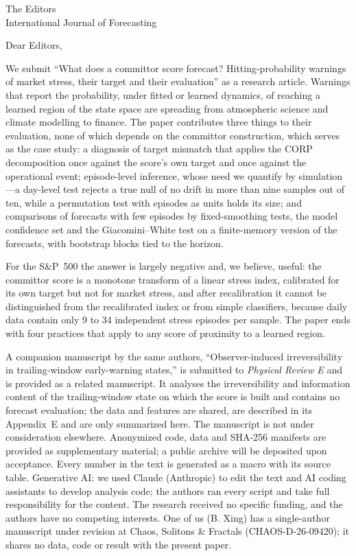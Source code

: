 \documentclass[11pt]{letter}
\begin{document}
\begin{letter}{The Editors\\International Journal of Forecasting}
\opening{Dear Editors,}
We submit ``What does a committor score forecast? Hitting-probability warnings of market stress, their target and their evaluation'' as a research article. Warnings that report the probability, under fitted or learned dynamics, of reaching a learned region of the state space are spreading from atmospheric science and climate modelling to finance. The paper contributes three things to their evaluation, none of which depends on the committor construction, which serves as the case study: a diagnosis of target mismatch that applies the CORP decomposition once against the score's own target and once against the operational event; episode-level inference, whose need we quantify by simulation---a day-level test rejects a true null of no drift in more than nine samples out of ten, while a permutation test with episodes as units holds its size; and comparisons of forecasts with few episodes by fixed-smoothing tests, the model confidence set and the Giacomini--White test on a finite-memory version of the forecasts, with bootstrap blocks tied to the horizon.

For the S\&P~500 the answer is largely negative and, we believe, useful: the committor score is a monotone transform of a linear stress index, calibrated for its own target but not for market stress, and after recalibration it cannot be distinguished from the recalibrated index or from simple classifiers, because daily data contain only 9 to 34 independent stress episodes per sample. The paper ends with four practices that apply to any score of proximity to a learned region.

A companion manuscript by the same authors, ``Observer-induced irreversibility in trailing-window early-warning states,'' is submitted to \emph{Physical Review E} and is provided as a related manuscript. It analyses the irreversibility and information content of the trailing-window state on which the score is built and contains no forecast evaluation; the data and features are shared, are described in its Appendix~E and are only summarized here. The manuscript is not under consideration elsewhere. Anonymized code, data and SHA-256 manifests are provided as supplementary material; a public archive will be deposited upon acceptance. Every number in the text is generated as a macro with its source table. Generative AI: we used Claude (Anthropic) to edit the text and AI coding assistants to develop analysis code; the authors ran every script and take full responsibility for the content. The research received no specific funding, and the authors have no competing interests. One of us (B. Xing) has a single-author manuscript under revision at Chaos, Solitons \& Fractals (CHAOS-D-26-09420); it shares no data, code or result with the present paper.


\end{letter}
\end{document}
